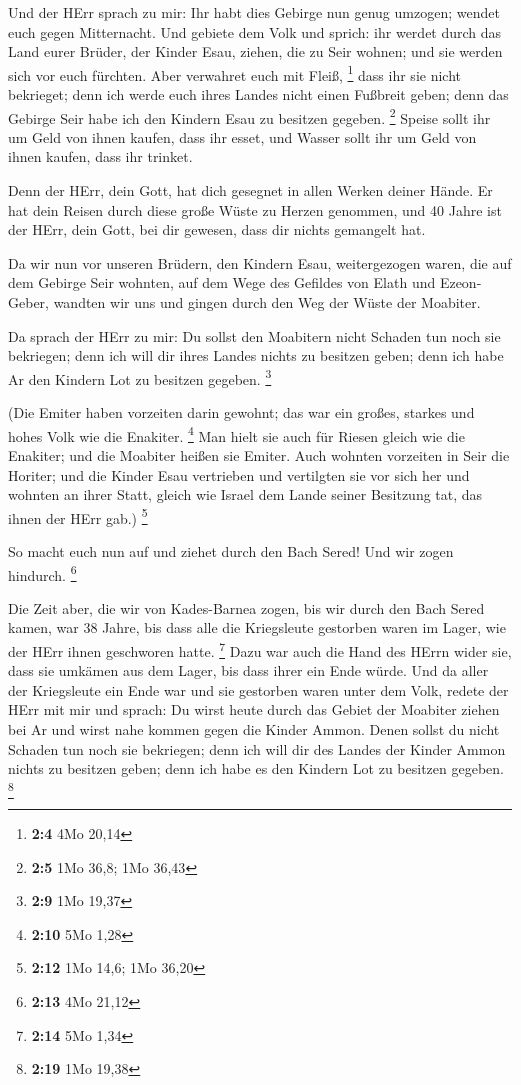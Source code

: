  Und der HErr sprach zu mir:  Ihr habt dies
Gebirge nun genug umzogen; wendet euch gegen Mitternacht. 
Und gebiete dem Volk und sprich: ihr werdet durch das Land eurer Brüder,
der Kinder Esau, ziehen, die zu Seir wohnen; und sie werden sich vor
euch fürchten. Aber verwahret euch mit Fleiß, \footnote{\textbf{2:4} 4Mo
  20,14}  dass ihr sie nicht bekrieget; denn ich werde euch
ihres Landes nicht einen Fußbreit geben; denn das Gebirge Seir habe ich
den Kindern Esau zu besitzen gegeben. \footnote{\textbf{2:5} 1Mo 36,8;
  1Mo 36,43}  Speise sollt ihr um Geld von ihnen kaufen,
dass ihr esset, und Wasser sollt ihr um Geld von ihnen kaufen, dass ihr
trinket.

 Denn der HErr, dein Gott, hat dich gesegnet in allen Werken
deiner Hände. Er hat dein Reisen durch diese große Wüste zu Herzen
genommen, und 40 Jahre ist der HErr, dein Gott, bei dir gewesen, dass
dir nichts gemangelt hat.

 Da wir nun vor unseren Brüdern, den Kindern Esau,
weitergezogen waren, die auf dem Gebirge Seir wohnten, auf dem Wege des
Gefildes von Elath und Ezeon-Geber, wandten wir uns und gingen durch den
Weg der Wüste der Moabiter.

 Da sprach der HErr zu mir: Du sollst den Moabitern nicht
Schaden tun noch sie bekriegen; denn ich will dir ihres Landes nichts zu
besitzen geben; denn ich habe Ar den Kindern Lot zu besitzen gegeben.
\footnote{\textbf{2:9} 1Mo 19,37}

 (Die Emiter haben vorzeiten darin gewohnt; das war ein
großes, starkes und hohes Volk wie die Enakiter. \footnote{\textbf{2:10}
  5Mo 1,28}  Man hielt sie auch für Riesen gleich wie die
Enakiter; und die Moabiter heißen sie Emiter.  Auch wohnten
vorzeiten in Seir die Horiter; und die Kinder Esau vertrieben und
vertilgten sie vor sich her und wohnten an ihrer Statt, gleich wie
Israel dem Lande seiner Besitzung tat, das ihnen der HErr gab.)
\footnote{\textbf{2:12} 1Mo 14,6; 1Mo 36,20}

 So macht euch nun auf und ziehet durch den Bach Sered! Und
wir zogen hindurch. \footnote{\textbf{2:13} 4Mo 21,12}

 Die Zeit aber, die wir von Kades-Barnea zogen, bis wir
durch den Bach Sered kamen, war 38 Jahre, bis dass alle die Kriegsleute
gestorben waren im Lager, wie der HErr ihnen geschworen hatte.
\footnote{\textbf{2:14} 5Mo 1,34}  Dazu war auch die Hand
des HErrn wider sie, dass sie umkämen aus dem Lager, bis dass ihrer ein
Ende würde.  Und da aller der Kriegsleute ein Ende war und
sie gestorben waren unter dem Volk,  redete der HErr mit
mir und sprach:  Du wirst heute durch das Gebiet der
Moabiter ziehen bei Ar  und wirst nahe kommen gegen die
Kinder Ammon. Denen sollst du nicht Schaden tun noch sie bekriegen; denn
ich will dir des Landes der Kinder Ammon nichts zu besitzen geben; denn
ich habe es den Kindern Lot zu besitzen gegeben. \footnote{\textbf{2:19}
  1Mo 19,38}

